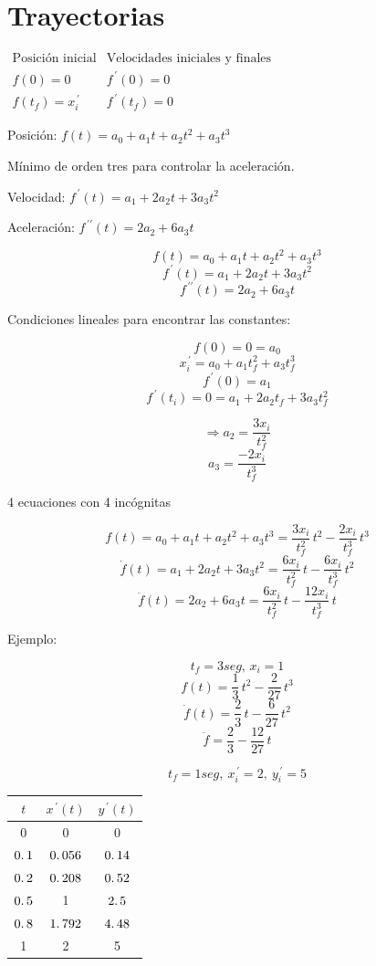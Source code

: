 \section{Trayectorias}

$
\begin{array}{cc}
	\mbox{Posición inicial} & \mbox{Velocidades iniciales y finales} \\
	f(0) = 0                & f^{\,\prime}(0) = 0 \\
	f(t_{f}) = x_{i}^{\,\prime} & f^{\,\prime} (t_{f}) = 0 
\end{array}
$

Posición: $f(t) = a_{0} + a_{1}t + a_{2}t^{2} + a_{3}t^{3}$

Mínimo de orden tres para controlar la aceleración.

Velocidad: $f^{\,\prime} (t) = a_{1} + 2a_{2}t + 3a_{3}t^2$

Aceleración: $f^{\,\prime\prime} (t) = 2a_{2} + 6a_{3}t$

$$f(t) = a_{0} + a_{1}t + a_{2}t^{2} + a_{3}t^{3}$$
$$f^{\,\prime} (t) = a_{1} + 2a_{2}t + 3a_{3}t^2$$
$$f^{\,\prime\prime} (t) = 2a_{2} + 6a_{3}t$$

Condiciones lineales para encontrar las constantes:

$$f(0) = 0 = a_{0}$$
$$x_{i}^{\,\prime} = a_{0} + a_{1}t_{f}^{2} + a_{3}t_{f}^{3}$$
$$f^{\,\prime}(0) = a_{1}$$
$$f^{\,\prime}(t_{i}) = 0 = a_{1} + 2a_{2}t_{f} + 3a_{3}t_{f}^{2}$$

$$\Rightarrow a_{2} = \dfrac{3x_{i}}{t_{f}^{2}}$$
$$a_{3} = \dfrac{-2x_{i}}{t_{f}^{3}}$$
	
4 ecuaciones con 4 incógnitas

$$f(t) = a_{0} + a_{1}t + a_{2}t^{2} + a_{3}t^{3} = \dfrac{3x_{i}}{t_{f}^{2}}\,t^{2} - \dfrac{2x_{i}}{t_{f}^{3}}\,t^{3}$$
$$\dot{f}(t) = a_{1} + 2a_{2}t + 3a_{3}t^2 = \dfrac{6x_{i}}{t_{f}^2}\,t - \dfrac{6x_{i}}{t_{f}^3}\, t^2$$
$$\ddot{f} (t) = 2a_{2} + 6a_{3}t = \dfrac{6x_{i}}{t_{f}^2}\,t - \dfrac{12x_{i}}{t_{f}^3}\, t$$

Ejemplo:

$$t_{f} = 3 seg,\, x_{i} = 1$$
$$f(t) = \dfrac{1}{3}\,t^2 - \dfrac{2}{27}\,t^3$$
$$\dot{f}(t) = \dfrac{2}{3}\, t - \dfrac{6}{27}\,t^2$$
$$\ddot{f} = \dfrac{2}{3} - \dfrac{12}{27}\, t$$


$$t_{f} = 1seg,\: x_{i}^{\,\prime} = 2,\: y_{i}^{\,\prime} = 5$$


\begin{table}[h!]
	\centering
	\begin{tabular}{c|c|c}
		$t$ & $x^{\,\prime} (t)$ & $y^{\,\prime}(t)$\\\hline
		0 & 0 & 0 \\
		$0\ldotp1$ & $0\ldotp056$ & $0\ldotp14$ \\
		$0\ldotp2$ & $0\ldotp208$ & $0\ldotp52$ \\
		$0\ldotp5$ & 1 & $2\ldotp5$ \\
		$0\ldotp8$ & $1\ldotp792$ & $4\ldotp48$ \\
		1 & 2 & 5
	\end{tabular}
\end{table}


